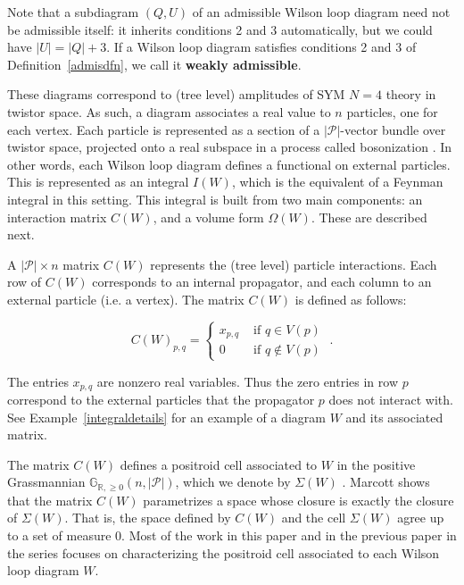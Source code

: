 \documentclass[11pt]{article}
\newcommand{\R}{\mathbb{R}}
\newcommand{\Gr}{\mathbb{G}_{\R, \geq 0}}
\newcommand{\cP}{\mathcal{P}}
\theoremstyle{remark}
\theoremstyle{definition}
\begin{document}
Note that a subdiagram $(Q,U)$ of an admissible Wilson loop diagram need not be admissible itself: it inherits conditions 2 and 3 automatically, but we could have $|U| = |Q| + 3$. If a Wilson loop diagram satisfies conditions 2 and 3 of Definition~\ref{admisdfn}, we call it {\bf weakly admissible}.

These diagrams correspond to (tree level) amplitudes of SYM $N=4$ theory in twistor space. As such, a diagram associates a real value to $n$ particles, one for each vertex. Each particle is represented as a section of a $|\cP|$-vector bundle over twistor space, projected onto a real subspace in a process called bosonization \cite[section 2]{Amplituhedronsquared}. In other words, each Wilson loop diagram defines a functional on external particles. This is represented as an integral $I(W)$, which is the equivalent of a Feynman integral in this setting. This integral is built from two main components: an interaction matrix $C(W)$, and a volume form $\Omega(W)$. These are described next.

A $|\cP| \times n$ matrix $C(W)$ represents the (tree level) particle interactions. Each row of $C(W)$ corresponds to an internal propagator, and each column to an external particle (i.e. a vertex). The matrix $C(W)$ is defined as follows:

\begin{equation} C(W)_{p,q} = \begin{cases} x_{p,q} & \textrm{ if } q \in V(p) \\
0  & \textrm{ if } q \not \in V(p)  \end{cases}
\;. \label{C(W) dfn}\end{equation} 

The entries $x_{p,q}$ are nonzero real variables. Thus the zero entries in row $p$ correspond to the external particles that the propagator $p$ does not interact with. See Example~\ref{integraldetails} for an example of a diagram $W$ and its associated matrix.

The matrix $C(W)$ defines a positroid cell associated to $W$ in the positive Grassmannian $\Gr(n, |\cP|)$, which we denote by $\Sigma(W)$ \cite[Theorem 3.41]{wilsonloop}. Marcott \cite[Theorem 8.4]{WLDdim} shows that  the matrix $C(W)$ parametrizes a space whose closure is exactly the closure of $\Sigma(W)$. That is, the space defined by $C(W)$ and the cell $\Sigma(W)$ agree up to a set of measure $0$. Most of the work in this paper and in the previous paper in the series \cite{generalcombinatoricsI} focuses on characterizing the positroid cell associated to each Wilson loop diagram $W$. 
\end{document}
